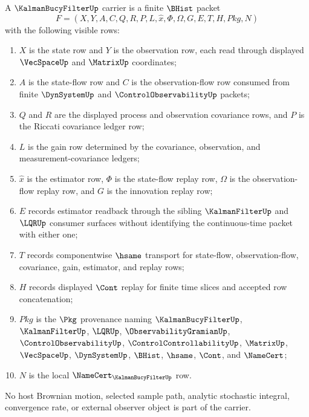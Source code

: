 \begin{definition}
\label{def:kalman-bucy-filter-carrier}
A $\KalmanBucyFilterUp$ carrier is a finite $\BHist$ packet
$$
F=(X,Y,A,C,Q,R,P,L,\widehat{x},\Phi,\Omega,G,E,T,H,Pkg,N)
$$
with the following visible rows:
\begin{enumerate}
\item $X$ is the state row and $Y$ is the observation row, each read through displayed $\VecSpaceUp$ and $\MatrixUp$ coordinates;
\item $A$ is the state-flow row and $C$ is the observation-flow row consumed from finite $\DynSystemUp$ and $\ControlObservabilityUp$ packets;
\item $Q$ and $R$ are the displayed process and observation covariance rows, and $P$ is the Riccati covariance ledger row;
\item $L$ is the gain row determined by the covariance, observation, and measurement-covariance ledgers;
\item $\widehat{x}$ is the estimator row, $\Phi$ is the state-flow replay row, $\Omega$ is the observation-flow replay row, and $G$ is the innovation replay row;
\item $E$ records estimator readback through the sibling $\KalmanFilterUp$ and $\LQRUp$ consumer surfaces without identifying the continuous-time packet with either one;
\item $T$ records componentwise $\hsame$ transport for state-flow, observation-flow, covariance, gain, estimator, and replay rows;
\item $H$ records displayed $\Cont$ replay for finite time slices and accepted row concatenation;
\item $Pkg$ is the $\Pkg$ provenance naming $\KalmanBucyFilterUp$, $\KalmanFilterUp$, $\LQRUp$, $\ObservabilityGramianUp$, $\ControlObservabilityUp$, $\ControlControllabilityUp$, $\MatrixUp$, $\VecSpaceUp$, $\DynSystemUp$, $\BHist$, $\hsame$, $\Cont$, and $\NameCert$;
\item $N$ is the local $\NameCert_{\KalmanBucyFilterUp}$ row.
\end{enumerate}
No host Brownian motion, selected sample path, analytic stochastic integral, convergence rate, or external observer object is part of the carrier.
\end{definition}

